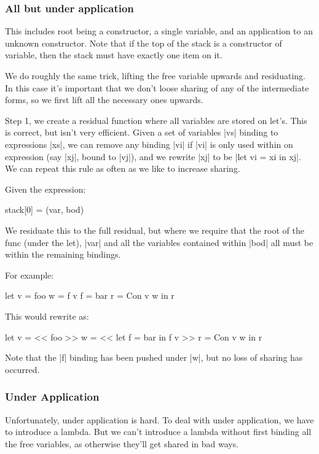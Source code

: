 \documentclass{sigplanconf}
\begin{document}
\subsubsection{All but under application}

This includes root being a constructor, a single variable, and an application to an unknown constructor. Note that if the top of the stack is a constructor of variable, then the stack must have exactly one item on it.

We do roughly the same trick, lifting the free variable upwards and residuating. In this case it's important that we don't loose sharing of any of the intermediate forms, so we first lift all the necessary ones upwards.

Step 1, we create a residual function where all variables are stored on let's. This is correct, but isn't very efficient. Given a set of variables |vs| binding to expressions |xs|, we can remove any binding |vi| if |vi| is only used within on expression (say |xj|, bound to |vj|), and we rewrite |xj| to be |let vi = xi in xj|. We can repeat this rule as often as we like to increase sharing.

Given the expression:

\begin{code}
stack[0] = (var, bod)
\end{code}

We residuate this to the full residual, but where we require that the root of the func (under the let), |var| and all the variables contained within |bod| all must be within the remaining bindings.

For example:

\begin{code}
let v = foo
    w = f v
    f = bar
    r = Con v w
in r
\end{code}

This would rewrite as:

\begin{code}
let v = << foo >>
    w = << let f = bar in f v >>
    r = Con v w
in r
\end{code}

Note that the |f| binding has been pushed under |w|, but no loss of sharing has occurred.

\subsubsection{Under Application}

Unfortunately, under application is hard. To deal with under application, we have to introduce a lambda. But we can't introduce a lambda without first binding all the free variables, as otherwise they'll get shared in bad ways.
\end{document}
